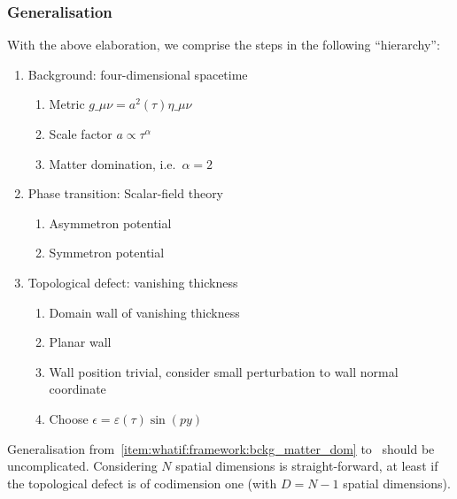 \subsubsection{Generalisation}
With the above elaboration, we comprise the steps in the following ``hierarchy'':
\begin{enumerate}
    \item\label{item:whatif:framework:bckg} Background: four-dimensional spacetime %
    \begin{enumerate}
        \item Metric $g\_{\mu\nu}= a^2(\tau)\eta\_{\mu\nu}$ 
        \item\label{item:whatif:framework:bckg_simple_scale_factor} Scale factor $a\propto \tau^\alpha$
        \item\label{item:whatif:framework:bckg_matter_dom} Matter domination, i.e.~$\alpha=2$
    \end{enumerate}
    \item\label{item:whatif:framework:pt}  Phase transition: Scalar-field theory %
        \begin{enumerate}
            \item\label{item:whatif:framework:pt_asymmetron} Asymmetron potential
            \item\label{item:whatif:framework:pt_symmetron}  Symmetron potential
        \end{enumerate}
    \item\label{item:whatif:framework:defect} Topological defect: vanishing thickness %
        \begin{enumerate}
            \item\label{item:whatif:framework:defect_dw} Domain wall of vanishing thickness 
            \item\label{item:whatif:framework:defect_planar} Planar wall
            \item\label{item:whatif:framework:defect_pert} Wall position trivial, consider small perturbation to wall normal coordinate
            \item\label{item:whatif:framework:defect_simple_pert} Choose $\epsilon=\varepsilon(\tau)\sin(py)$
        \end{enumerate}
\end{enumerate}


Generalisation from~\cref{item:whatif:framework:bckg_matter_dom} to~ %
should be uncomplicated. Considering $N$ spatial dimensions is straight-forward, at least if the topological defect is of codimension one (with $D=N-1$ spatial dimensions). %


